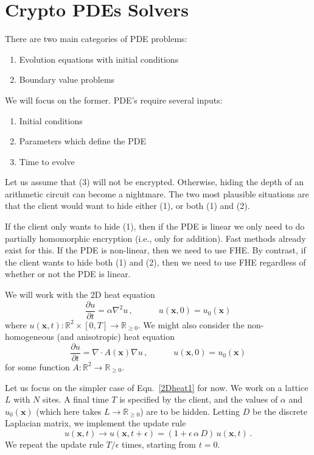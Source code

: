 \documentclass[12pt]{article}
\begin{document}
\section*{Crypto PDEs Solvers}

There are two main categories of PDE problems:
\begin{enumerate}
\item Evolution equations with initial conditions
\item Boundary value problems
\end{enumerate}
We will focus on the former.  PDE's require several inputs:
\begin{enumerate}
\item Initial conditions
\item Parameters which define the PDE
\item Time to evolve
\end{enumerate}
Let us assume that (3) will not be encrypted.  Otherwise, hiding the depth of an arithmetic circuit can become a nightmare.  The two most plausible situations are that the client would want to hide either (1), or both (1) and (2).

If the client only wants to hide (1), then if the PDE is linear we only need to do partially homomorphic encryption (i.e., only for addition).  Fast methods already exist for this.  If the PDE is non-linear, then we need to use FHE.  By contrast, if the client wants to hide both (1) and (2), then we need to use FHE regardless of whether or not the PDE is linear.

We will work with the 2D heat equation
\begin{equation}
\label{2Dheat1}
\frac{\partial u}{\partial t} = \alpha \nabla^2 u\,, \qquad \quad u(\textbf{x},0) = u_0(\textbf{x})
\end{equation}
where $u(\textbf{x},t) : \mathbb{R}^2 \times [0,T] \to \mathbb{R}_{\geq 0}$.  We might also consider the non-homogeneous (and anisotropic) heat equation
\begin{equation}
\label{2Dheat2}
\frac{\partial u}{\partial t} = \nabla \cdot A(\textbf{x}) \nabla u\,, \qquad \quad u(\textbf{x},0) = u_0(\textbf{x})
\end{equation}
for some function $A : \mathbb{R}^2 \to \mathbb{R}_{\geq 0}$.

Let us focus on the simpler case of Eqn.~\eqref{2Dheat1} for now.  We work on a lattice $L$ with $N$ sites.  A final time $T$ is specified by the client, and the values of $\alpha$ and $u_0(\textbf{x})$ (which here takes $L \to \mathbb{R}_{\geq 0}$) are to be hidden.  Letting $D$ be the discrete Laplacian matrix, we implement the update rule
\begin{equation}
u(\textbf{x},t) \longrightarrow u(\textbf{x},t+\epsilon) = (1 + \epsilon \,\alpha \, D)\,u(\textbf{x},t)\,.
\end{equation}  
We repeat the update rule $T/\epsilon$ times, starting from $t=0$.
\end{document}
